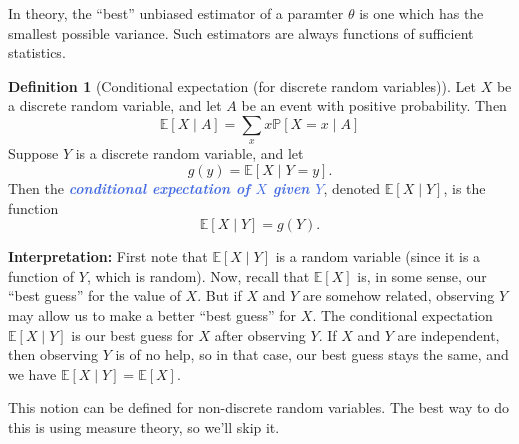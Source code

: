 \documentclass[10pt]{article}
\theoremstyle{definition}
\newtheorem{definition}[theorem]{Definition}
\newcommand{\vt}{\vskip 5mm} %
\newcommand{\Fl}{\vt\noindent\textbf} %
\newcommand{\1}[1]{\textbf{1}_{\left[#1\right]}} %
\def\E{\mathbb{E}} %
\def\P{\mathbb{P}} %
\newcommand{\demph}[1]{\textcolor{RoyalBlue}{\textbf{\slshape #1}}} %
\begin{document}
In theory, the ``best'' unbiased estimator of a paramter $\theta$  is one which has the smallest
possible variance. Such estimators are always functions of sufficient
statistics.

\begin{definition}[Conditional expectation (for discrete random variables)]
  Let $X$ be a discrete random variable, and let $A$ be an event with positive probability. Then
  \begin{equation*}
    \E\left[X \mid A\right] = \sum_{x}x \P\left[X=x\mid A \right]
  \end{equation*}
  Suppose $Y$ is a discrete random variable, and let
  \begin{equation*}
    g(y) = \E\left[X\mid Y=y \right].
  \end{equation*}
  Then the \demph{conditional expectation of $X$ given $Y$}, denoted
  $\E\left[X\mid Y \right]$, is the function
  \begin{equation*}
    \E\left[X\mid Y \right]=g(Y).
  \end{equation*}
\end{definition}
\Fl{Interpretation:} First note that $\E\left[X\mid Y \right]$ is a random
variable (since it is a function of $Y$, which is random). Now, recall that
$\E\left[X \right]$ is, in some sense, our ``best guess'' for the value of
$X$. But if $X$ and $Y$ are somehow related, observing $Y$ may allow us to
make a better ``best guess'' for $X$. The conditional expectation
$\E\left[X\mid Y\right]$ is our best guess for $X$ after observing $Y$. If $X$
and $Y$ are independent, then observing $Y$ is of no help, so in that case,
our best guess stays the same, and we have
$\E\left[X\mid Y \right]= \E\left[X \right]$.

This notion can be defined for non-discrete random variables. The best way to
do this is using measure theory, so we'll skip it.
\end{document}
